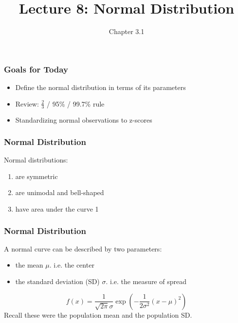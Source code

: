 \documentclass[handout]{beamer}
\title{Lecture 8: Normal Distribution}
\author{Chapter 3.1}
\date{}
\newcommand{\blue}[1]{\textcolor{blue2}{#1}}
\begin{document}
\begin{frame}
\titlepage
\end{frame}


\begin{frame}
\frametitle{Goals for Today}

\begin{itemize}
\item Define the normal distribution in terms of its \blue{parameters}
\item Review: $\frac{2}{3}$ / 95\% / 99.7\% rule
\item Standardizing normal observations to \blue{z-scores}
\end{itemize}


\end{frame}


\begin{frame}[fragile]
\frametitle{Normal Distribution}
%
%
Normal distributions:
\begin{enumerate}
\item are symmetric
\item are unimodal and bell-shaped
\item have area under the curve 1
\end{enumerate}

\end{frame}


\begin{frame}[fragile]
\frametitle{Normal Distribution}
%
%
A normal curve can be described by two \blue{parameters}:
\begin{itemize}
\item the \blue{mean $\mu$}. i.e. the center
\item the \blue{standard deviation (SD) $\sigma$}. i.e. the measure of spread
\end{itemize}
\pause\vspace{0.25cm}
\[
f(x) = \frac{1}{\sqrt{2\pi}\sigma}\exp\left( -\frac{1}{2\sigma^2}(x-\mu)^2 \right)
\]
\pause\vspace{0.25cm}
Recall these were the \blue{population mean} and the \blue{population SD}.

\end{frame}
\end{document}
